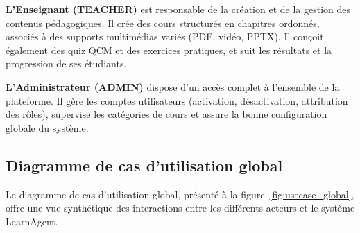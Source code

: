 \documentclass[12pt,a4paper]{report}
\begin{document}
\textbf{L'Enseignant (TEACHER)} est responsable de la création et de la gestion des contenus pédagogiques. Il crée des cours structurés en chapitres ordonnés, associés à des supports multimédias variés (PDF, vidéo, PPTX). Il conçoit également des quiz QCM et des exercices pratiques, et suit les résultats et la progression de ses étudiants.

\textbf{L'Administrateur (ADMIN)} dispose d'un accès complet à l'ensemble de la plateforme. Il gère les comptes utilisateurs (activation, désactivation, attribution des rôles), supervise les catégories de cours et assure la bonne configuration globale du système.

\subsection{Diagramme de cas d'utilisation global}

Le diagramme de cas d'utilisation global, présenté à la figure~\ref{fig:usecase_global}, offre une vue synthétique des interactions entre les différents acteurs et le système LearnAgent.
\end{document}
